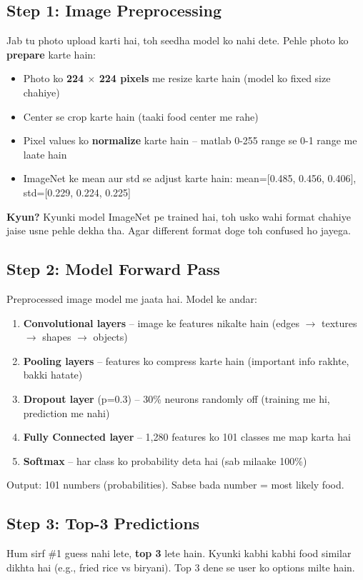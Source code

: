 \documentclass[11pt,a4paper]{article}
\begin{document}
\subsection{Step 1: Image Preprocessing}
Jab tu photo upload karti hai, toh seedha model ko nahi dete. Pehle photo ko \textbf{prepare} karte hain:
\begin{itemize}[leftmargin=1.2cm]
\item Photo ko \textbf{224 $\times$ 224 pixels} me resize karte hain (model ko fixed size chahiye)
\item Center se crop karte hain (taaki food center me rahe)
\item Pixel values ko \textbf{normalize} karte hain -- matlab 0-255 range se 0-1 range me laate hain
\item ImageNet ke mean aur std se adjust karte hain: mean=[0.485, 0.456, 0.406], std=[0.229, 0.224, 0.225]
\end{itemize}

\textbf{Kyun?} Kyunki model ImageNet pe trained hai, toh usko wahi format chahiye jaise usne pehle dekha tha. Agar different format doge toh confused ho jayega.

\subsection{Step 2: Model Forward Pass}
Preprocessed image model me jaata hai. Model ke andar:
\begin{enumerate}[leftmargin=1.2cm]
\item \textbf{Convolutional layers} -- image ke features nikalte hain (edges $\rightarrow$ textures $\rightarrow$ shapes $\rightarrow$ objects)
\item \textbf{Pooling layers} -- features ko compress karte hain (important info rakhte, bakki hatate)
\item \textbf{Dropout layer} (p=0.3) -- 30\% neurons randomly off (training me hi, prediction me nahi)
\item \textbf{Fully Connected layer} -- 1,280 features ko 101 classes me map karta hai
\item \textbf{Softmax} -- har class ko probability deta hai (sab milaake 100\%)
\end{enumerate}

Output: 101 numbers (probabilities). Sabse bada number = most likely food.

\subsection{Step 3: Top-3 Predictions}
Hum sirf \#1 guess nahi lete, \textbf{top 3} lete hain. Kyunki kabhi kabhi food similar dikhta hai (e.g., fried rice vs biryani). Top 3 dene se user ko options milte hain.
\end{document}
